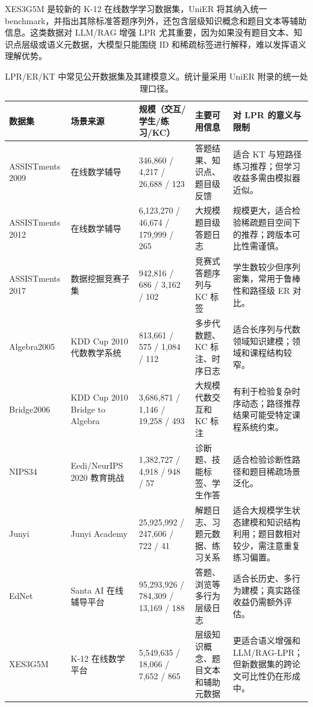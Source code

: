 \documentclass[UTF8,a4paper,zihao=-4]{ctexart}
\begin{document}
XES3G5M 是较新的 K-12 在线数学学习数据集，UniER 将其纳入统一 benchmark，并指出其除标准答题序列外，还包含层级知识概念和题目文本等辅助信息\cite{Cheng2026UniER}。这类数据对 LLM/RAG 增强 LPR 尤其重要，因为如果没有题目文本、知识点层级或语义元数据，大模型只能围绕 ID 和稀疏标签进行解释，难以发挥语义理解优势。

\begin{table}[t]
\centering
\caption{LPR/ER/KT 中常见公开数据集及其建模意义。统计量采用 UniER 附录的统一处理口径。}
\label{tab:lpr-datasets}
\small
\begin{tabularx}{\textwidth}{p{2.55cm}p{2.15cm}p{2.75cm}p{3.0cm}X}
\toprule
数据集 & 场景来源 & 规模（交互/学生/练习/KC） & 主要可用信息 & 对 LPR 的意义与限制 \\
\midrule
ASSISTments 2009 & 在线数学辅导 & 346,860 / 4,217 / 26,688 / 123 & 答题结果、知识点、题目级反馈 & 适合 KT 与短路径练习推荐；但学习收益多需由模拟器近似\cite{ASSISTmentsData2009,Cheng2026UniER}。\\
ASSISTments 2012 & 在线数学辅导 & 6,123,270 / 46,674 / 179,999 / 265 & 大规模题目级答题日志 & 规模更大，适合检验稀疏题目空间下的推荐；跨版本可比性需谨慎\cite{Cheng2026UniER}。\\
ASSISTments 2017 & 数据挖掘竞赛子集 & 942,816 / 686 / 3,162 / 102 & 竞赛式答题序列与 KC 标签 & 学生数较少但序列密集，常用于鲁棒性和路径级 ER 对比\cite{Cheng2026UniER}。\\
Algebra2005 & KDD Cup 2010 代数教学系统 & 813,661 / 575 / 1,084 / 112 & 多步代数题、KC 标注、时序日志 & 适合长序列与代数领域知识建模；领域和课程结构较窄\cite{Cheng2026UniER}。\\
Bridge2006 & KDD Cup 2010 Bridge to Algebra & 3,686,871 / 1,146 / 19,258 / 493 & 大规模代数交互和 KC 标注 & 有利于检验复杂时序动态；路径推荐结果可能受特定课程系统约束\cite{Cheng2026UniER}。\\
NIPS34 & Eedi/NeurIPS 2020 教育挑战 & 1,382,727 / 4,918 / 948 / 57 & 诊断题、技能标签、学生作答 & 适合检验诊断性路径和题目稀疏场景泛化\cite{Wang2020NeurIPSEducation,Cheng2026UniER}。\\
Junyi & Junyi Academy & 25,925,992 / 247,606 / 722 / 41 & 解题日志、习题元数据、练习关系 & 适合大规模学生状态建模和知识结构利用；题目数相对较少，需注意重复练习偏置\cite{Liu2019CSEAL,Cheng2026UniER}。\\
EdNet & Santa AI 在线辅导平台 & 95,293,926 / 784,309 / 13,169 / 188 & 答题、浏览等多行为层级日志 & 适合长历史、多行为建模；真实路径收益仍需额外评估\cite{Choi2020EdNet,Cheng2026UniER}。\\
XES3G5M & K-12 在线数学平台 & 5,549,635 / 18,066 / 7,652 / 865 & 层级知识概念、题目文本和辅助元数据 & 更适合语义增强和 LLM/RAG-LPR；但新数据集的跨论文可比性仍在形成中\cite{Cheng2026UniER}。\\
\bottomrule
\end{tabularx}
\end{table}
\end{document}

